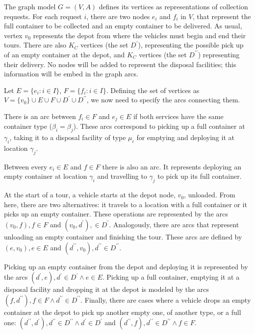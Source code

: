 The graph model $G = (V, A)$ defines its vertices as representations of
collection requests. For each request $i$, there are two nodes $e_i$ and $f_i$
in $V$, that represent the full container to be collected and an empty
container to be delivered. As usual, vertex $v_0$ represents the
depot from where the vehicles must begin and end their tours. There are also
$K_C$ vertices (the set $D^\prime$), representing the possible pick up of an
empty container at the depot, and $K_C$ vertices (the set $D^{\prime\prime}$)
representing their delivery. No nodes will be added to represent the disposal
facilities; this information will be embed in the graph arcs.

Let $E = \{e_i : i \in I\}$, $F = \{f_i : i \in I\}$. Defining the set of
vertices as $V = \{v_0\} \cup E \cup F \cup D^\prime \cup D^{\prime\prime}$, we
now need to specify the arcs connecting them.

There is an arc between $f_i \in F$ and $e_j \in E$ if both services have the
same container type ($\beta_i = \beta_j$). These arcs correspond to picking up
a full container at $\gamma_i$, taking it to a disposal facility of type
$\mu_i$ for emptying and deploying it at location $\gamma_j$.

Between every $e_i \in E$ and $f \in F$ there is also an arc. It represents
deploying an empty container at location $\gamma_i$ and travelling to
$\gamma_j$ to pick up its full container.

At the start of a tour, a vehicle starts at the depot node, $v_0$, unloaded.
From here, there are two alternatives: it travels to a location with a full
container or it picks up an empty container. These operations are represented
by the arcs $(v_0, f), f \in F$ and $(v_0, d^\prime), \in D^\prime$.
Analogously, there are arcs that represent unloading an empty container and
finishing the tour. These arcs are defined by $(e, v_0), e \in E$ and
$(d^{\prime\prime}, v_0), d^{\prime\prime} \in D^{\prime\prime}$.

Picking up an empty container from the depot and deploying it is represented by
the arcs $(d^\prime, e), d^\prime \in D^\prime \wedge e \in E$. Picking up a
full container, emptying it at a disposal facility and dropping it at the depot
is modeled by the arcs $(f, d^{\prime\prime}), f \in F \wedge d^{\prime\prime}
\in D^{\prime\prime}$. Finally, there are cases where a vehicle drops an
empty container at the depot to pick up another empty one, of another type, or
a full one: $(d^{\prime\prime}, d^\prime), d^{\prime\prime} \in
D^{\prime\prime} \wedge d^\prime \in D^\prime$ and $(d^{\prime\prime}, f),
d^{\prime\prime} \in D^{\prime\prime} \wedge f \in F$.

